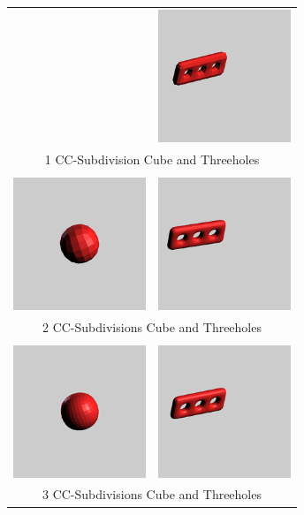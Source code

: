 \documentclass[12pt,a4paper]{scrartcl}
\begin{document}
\begin{longtable}{cc}
	& \includegraphics[width=150px, height=150px]{Images/threeholes-1sd.png}  \\
	\multicolumn{2}{c}{1 CC-Subdivision Cube and Threeholes} \\
	&\\
	\includegraphics[width=150px, height=150px]{Images/cube-2sd.png} 
	& \includegraphics[width=150px, height=150px]{Images/threeholes-2sd.png}  \\
	\multicolumn{2}{c}{2 CC-Subdivisions Cube and Threeholes} \\
	&\\
	\includegraphics[width=150px, height=150px]{Images/cube-3sd.png} 
	& \includegraphics[width=150px, height=150px]{Images/threeholes-3sd.png}  \\
	\multicolumn{2}{c}{3 CC-Subdivisions Cube and Threeholes} \\
\end{longtable}
\end{document}
